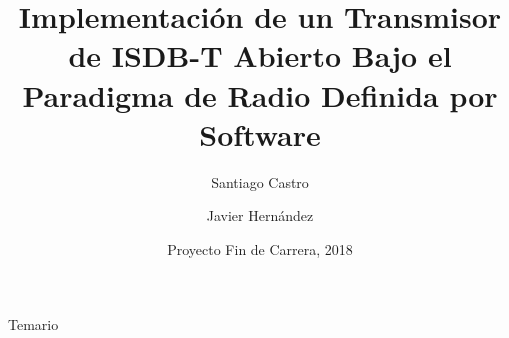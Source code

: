 \documentclass{beamer}
\title{Implementación de un Transmisor de ISDB-T Abierto Bajo el Paradigma de Radio Definida por Software}
\author{Santiago Castro \and Javier Hernández}
\institute[] %
{
  Universidad de la República\\
  Facultad de Ingeniería\\
  Instituto de Ingeniería Eléctrica
 
}
\date{Proyecto Fin de Carrera, 2018}
\begin{document}
\begin{frame}
  \titlepage
\end{frame}

\begin{frame}{Temario}
  \tableofcontents
\end{frame}








\end{document}
